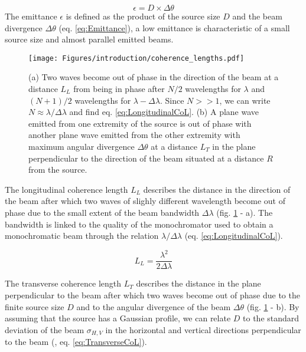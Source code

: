 \begin{equation}
    \label{eq:Emittance}
    \epsilon = D \times \Delta\theta
\end{equation}
The emittance $\epsilon$ is defined as the product of the source size $D$ and the beam divergence $\Delta\theta$ (eq. \ref{eq:Emittance}), a low emittance is characteristic of a small source size and almost parallel emitted beams.

\begin{figure}[!htb]
    \centering
    \texttt{[image: Figures/introduction/coherence\_lengths.pdf]}
    \caption{
    (a) Two waves become out of phase in the direction of the beam at a distance $L_L$ from being in phase after $N/2$ wavelengths for $\lambda$ and $(N+1)/2$ wavelengths for $\lambda - \Delta\lambda$. Since $N >> 1$, we can write $N\approx\lambda/\Delta\lambda$ and find eq. \ref{eq:LongitudinalCoL}.
    (b) A plane wave emitted from one extremity of the source is out of phase with another plane wave emitted from the other extremity with maximum angular divergence $\Delta\theta$ at a distance $L_T$ in the plane perpendicular to the direction of the beam situated at a distance $R$ from the source.
    }
    \label{fig:CoherenceLengths}
\end{figure}

The longitudinal coherence length $L_L$ describes the distance in the direction of the beam after which two waves of slighly different wavelength become out of phase due to the small extent of the beam bandwidth $\Delta\lambda$ (fig. \ref{fig:CoherenceLengths} - a).
The bandwidth is linked to the quality of the monochromator used to obtain a monochromatic beam through the relation $\lambda/\Delta\lambda$ (eq. \ref{eq:LongitudinalCoL}).

\begin{equation}
    \label{eq:LongitudinalCoL}
    L_L = \frac{\lambda^2}{2\Delta\lambda}
\end{equation}

The transverse coherence length $L_T$ describes the distance in the plane perpendicular to the beam after which two waves become out of phase due to the finite source size $D$ and to the angular divergence of the beam $\Delta\theta$ (fig. \ref{fig:CoherenceLengths} - b).
By assuming that the source has a Gaussian profile, we can relate $D$ to the standard deviation of the beam $\sigma_{H, V}$ in the horizontal and vertical directions perpendicular to the beam (\cite{Willmott}, eq. \ref{eq:TransverseCoL}).


